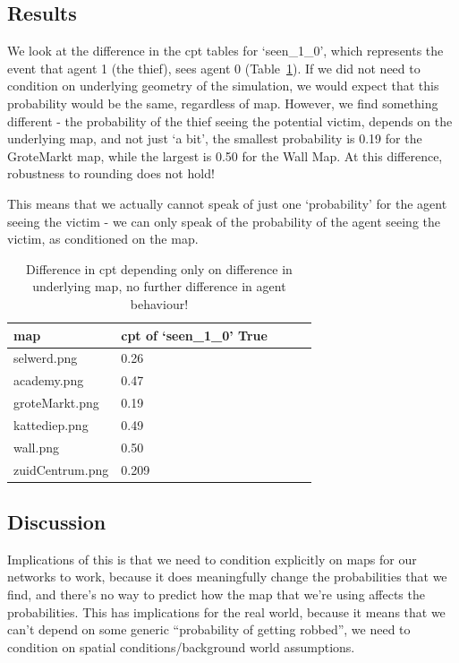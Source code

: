 \subsection{Results}

We look at the difference in the cpt tables for `seen\_1\_0', which represents the event that agent 1 (the thief), sees agent 0 (Table~\ref{mapstab}). If we did not need to condition on underlying geometry of the simulation, we would expect that this probability would be the same, regardless of map. However, we find something different - the probability of the thief seeing the potential victim, depends on the underlying map, and not just `a bit', the smallest probability is 0.19 for the GroteMarkt map, while the largest is 0.50 for the Wall Map. At this difference, robustness to rounding does not hold!

This means that we actually cannot speak of just one `probability' for the agent seeing the victim - we can only speak of the probability of the agent seeing the victim, as conditioned on the map. 

\begin{table}[]
\begin{tabular}{lllll}
map & cpt of `seen\_1\_0' True \\
\hline
selwerd.png &0.26\\
academy.png & 0.47\\
groteMarkt.png  &0.19\\
kattediep.png &0.49\\
wall.png &0.50\\
zuidCentrum.png & 0.209\\
\end{tabular}
\caption{Difference in cpt depending only on difference in underlying map, no further difference in agent behaviour!}
\label{mapstab}
\end{table}

\subsection{Discussion}
Implications of this is that we need to condition explicitly on maps for our networks to work, because it does meaningfully change the probabilities that we find, and there's no way to predict how the map that we're using affects the probabilities. This has implications for the real world, because it means that we can't depend on some generic ``probability of getting robbed'', we need to condition on spatial conditions/background world assumptions.


